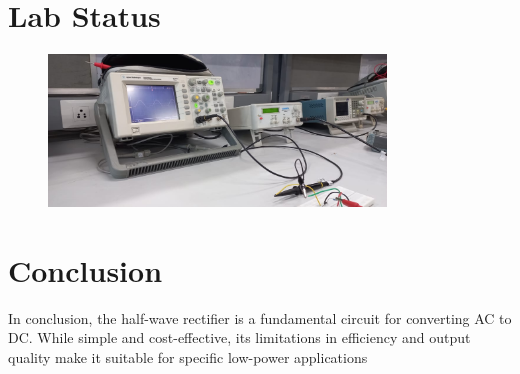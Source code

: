 \documentclass{article}
\begin{document}
\section*{Lab Status}
\begin{figure}[H]
    \centering
    \includegraphics[width=0.8\textwidth]{fig.jpeg}
\end{figure}


\section*{Conclusion}
In conclusion, the half-wave rectifier is a fundamental circuit for converting AC to DC. While simple and cost-effective, its limitations in efficiency and output quality make it suitable for specific low-power applications
\end{document}
